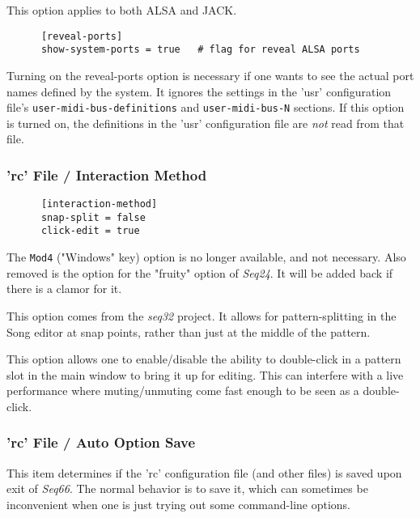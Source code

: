    This option applies to both ALSA and JACK.

   \begin{verbatim}
      [reveal-ports]
      show-system-ports = true   # flag for reveal ALSA ports
   \end{verbatim}

   Turning on the reveal-ports option is necessary if one
   wants to see the actual port names defined by the system.
   It ignores the settings in the 'usr' configuration file's
   \texttt{user-midi-bus-definitions} and \texttt{user-midi-bus-N} sections.
   If this option is turned on, the definitions in the
   'usr' configuration file are \textsl{not} read from that file.

\subsubsection{'rc' File / Interaction Method}
\label{subsubsec:configuration_rc_interaction}

   \begin{verbatim}
      [interaction-method]
      snap-split = false
      click-edit = true
   \end{verbatim}

   The \texttt{Mod4} ("Windows" key) option is no longer available, and not
   necessary.
   Also removed is the option for the "fruity" option of \textsl{Seq24}.
   It will be added back if there is a clamor for it.

   This option comes from the \textsl{seq32} project.  It allows for
   pattern-splitting in the Song editor at snap points, rather than just
   at the middle of the pattern.

   This option allows one to enable/disable the ability to double-click
   in a pattern slot in the main window to bring it up for editing.
   This can interfere with a live performance where muting/unmuting come fast
   enough to be seen as a double-click.

\subsubsection{'rc' File / Auto Option Save}
\label{subsubsec:configuration_rc_auto_option_save}

   This item determines if the 'rc' configuration file (and other files)
   is saved upon exit of \textsl{Seq66}.
   The normal behavior is to save it,
   which can sometimes be inconvenient when one is just trying out some
   command-line options.

